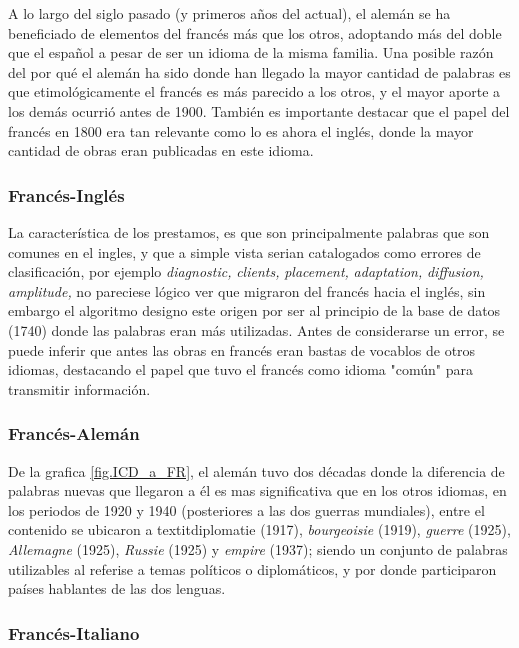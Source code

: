 A lo largo del siglo pasado (y primeros años del actual), el alemán se ha beneficiado de elementos del francés más que los otros, adoptando más del doble que el español a pesar de ser un idioma de la misma familia. Una posible razón del por qué el alemán ha sido donde han llegado la mayor cantidad de palabras es que etimológicamente el francés es más parecido a los otros, y el mayor aporte a los demás ocurrió antes de 1900.  También es importante destacar que el papel del francés en 1800 era tan relevante como lo es ahora el inglés, donde la mayor cantidad de obras eran publicadas en este idioma.


\subsubsection*{Francés-Inglés}

La característica de los prestamos, es que son principalmente palabras que son comunes en el ingles, y que a simple vista serian catalogados como errores de clasificación, por ejemplo  \textit{diagnostic,} \textit{clients,} \textit{placement,} \textit{adaptation,} \textit{diffusion,} \textit{amplitude,} no pareciese lógico ver que migraron del francés hacia el inglés, sin embargo el algoritmo designo este origen por ser al principio de la base de datos (1740)  donde las palabras eran más utilizadas.  Antes de considerarse un error, se puede inferir que antes las obras en francés eran bastas de vocablos de otros idiomas, destacando el papel que tuvo el francés como idioma "común" para transmitir información. 


\subsubsection*{Francés-Alemán}

De la grafica \ref{fig.ICD_a_FR}, el alemán tuvo dos décadas donde la diferencia de palabras nuevas que llegaron a él es mas significativa que en los otros idiomas, en los periodos de 1920 y 1940  (posteriores a las dos guerras mundiales), entre el contenido se ubicaron a  textit{diplomatie} (1917), \textit{bourgeoisie} (1919),  \textit{guerre} (1925), \textit{Allemagne} (1925), \textit{Russie} (1925) y \textit{empire} (1937); siendo un conjunto de palabras utilizables al referise a temas políticos  o diplomáticos, y por donde participaron países hablantes de las dos lenguas. 


\subsubsection*{Francés-Italiano}

